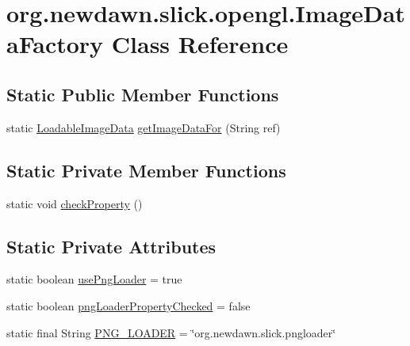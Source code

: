 \hypertarget{classorg_1_1newdawn_1_1slick_1_1opengl_1_1_image_data_factory}{}\section{org.\+newdawn.\+slick.\+opengl.\+Image\+Data\+Factory Class Reference}
\label{classorg_1_1newdawn_1_1slick_1_1opengl_1_1_image_data_factory}
\subsection*{Static Public Member Functions}
\begin{DoxyCompactItemize}
\item 
static \mbox{\hyperlink{interfaceorg_1_1newdawn_1_1slick_1_1opengl_1_1_loadable_image_data}{Loadable\+Image\+Data}} \mbox{\hyperlink{classorg_1_1newdawn_1_1slick_1_1opengl_1_1_image_data_factory_a76d9000037b8d8785c1f377d0f1d5bfb}{get\+Image\+Data\+For}} (String ref)
\end{DoxyCompactItemize}
\subsection*{Static Private Member Functions}
\begin{DoxyCompactItemize}
\item 
static void \mbox{\hyperlink{classorg_1_1newdawn_1_1slick_1_1opengl_1_1_image_data_factory_a20a3a399bfd4d8bc15a488e3358a3bf4}{check\+Property}} ()
\end{DoxyCompactItemize}
\subsection*{Static Private Attributes}
\begin{DoxyCompactItemize}
\item 
static boolean \mbox{\hyperlink{classorg_1_1newdawn_1_1slick_1_1opengl_1_1_image_data_factory_a75a99eb42388b269c695e0c078c65303}{use\+Png\+Loader}} = true
\item 
static boolean \mbox{\hyperlink{classorg_1_1newdawn_1_1slick_1_1opengl_1_1_image_data_factory_a0914d4737208dbff8b6b1bddc3054ed9}{png\+Loader\+Property\+Checked}} = false
\item 
static final String \mbox{\hyperlink{classorg_1_1newdawn_1_1slick_1_1opengl_1_1_image_data_factory_a2604900708ec909187ac502bccfaafa9}{P\+N\+G\+\_\+\+L\+O\+A\+D\+ER}} = \char`\"{}org.\+newdawn.\+slick.\+pngloader\char`\"{}
\end{DoxyCompactItemize}


